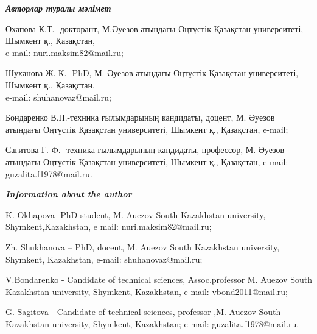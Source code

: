 \begin{authorinfo}
\hspace{1em}\emph{{\bfseries Авторлар туралы мәлімет}}

Охапова К.Т.- докторант, М.Әуезов атындағы Оңтүстік Қазақстан
университеті, Шымкент қ., Қазақстан,\\e-mail: nuri.maksim82@mail.ru;

Шуханова Ж. К.- PhD, М. Әуезов атындағы Оңтүстік Қазақстан университеті,
Шымкент қ., Қазақстан, \\e-mail: shuhanovaz@mail.ru;

Бондаренко В.П.-техника ғылымдарының кандидаты, доцент, М. Әуезов
атындағы Оңтүстік Қазақстан университеті, Шымкент қ., Қазақстан, e-mail;

Сагитова Г. Ф.- техника ғылымдарының кандидаты, профессор, М. Әуезов
атындағы Оңтүстік Қазақстан университеті, Шымкент қ., Қазақстан, e-mail:
guzalita.f1978@mail.ru.

\hspace{1em}\emph{{\bfseries Information about the author}}

K. Okhapova- PhD student, M. Auezov South Kazakhstan university,
Shymkent,Kazakhstan, e mail: nuri.maksim82@mail.ru;

Zh. Shukhanova -- PhD, docent, M. Auezov South Kazakhstan university,
Shymkent, Kazakhstan, e-mail: shuhanovaz@mail.ru;

V.Bondarenko - Candidate of technical sciences, Assoc.professor M.
Auezov South Kazakhstan university, Shymkent, Kazakhstan, e mail:
vbond2011@mail.ru;

G. Sagitova - Candidate of technical sciences, professor ,M. Auezov
South Kazakhstan university, Shymkent, Kazakhstan; e mail:
guzalita.f1978@mail.ru.
\end{authorinfo}
